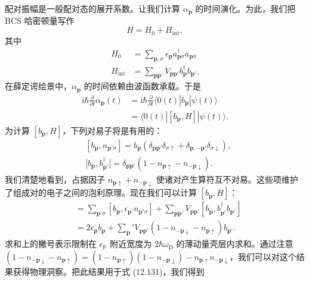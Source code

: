 配对振幅是一般配对态的展开系数。让我们计算 $\alpha_{\mathbf p}$ 的时间演化。为此，我们把 BCS 哈密顿量写作
\begin{equation*}
H=H_0+H_{\mathrm{int}}, \tag{12.127}
\end{equation*}
其中
\begin{align*}
H_0&=\sum_{\mathbf p,\sigma}\epsilon_{\mathbf p}a^\dagger_{\mathbf p\sigma}a_{\mathbf p\sigma}\\
H_{\mathrm{int}}&=\sum_{\mathbf p\mathbf p'}V_{\mathbf p\mathbf p'}b^\dagger_{\mathbf p}b_{\mathbf p'}. \tag{12.128}
\end{align*}
在薛定谔绘景中，$\alpha_{\mathbf p}$ 的时间依赖由波函数承载。于是
\begin{align*}
\mathrm i\hbar\frac{\partial}{\partial t}\alpha_{\mathbf p}(t)&=\mathrm i\hbar\frac{\partial}{\partial t}\big\langle 0(t)\left|b_{\mathbf p}\right|\psi(t)\big\rangle\\
&=\big\langle 0(t)\left|\left[b_{\mathbf p},H\right]\right|\psi(t)\big\rangle. \tag{12.129}
\end{align*}
为计算 $[b_{\mathbf p},H]$，下列对易子将是有用的：
\begin{align*}
&\left[b_{\mathbf p},n_{\mathbf p'\sigma}\right]=b_{\mathbf p}\left(\delta_{\mathbf p\mathbf p'}\delta_{\sigma\uparrow}+\delta_{\mathbf p,-\mathbf p'}\delta_{\sigma\downarrow}\right),\\
&\Big[b_{\mathbf p},b^\dagger_{\mathbf p'}\Big]=\delta_{\mathbf p\mathbf p'}\left(1-n_{\mathbf p\uparrow}-n_{-\mathbf p\downarrow}\right). \tag{12.130}
\end{align*}
我们清楚地看到，占据因子 $n_{\mathbf p\uparrow}+n_{-\mathbf p\downarrow}$ 使诸对产生算符互不对易。这些项维护了组成对的电子之间的泡利原理。现在我们可以计算 $[b_{\mathbf p},H]$：
\begin{align*}
[b_{\mathbf p},H]&=\sum_{\mathbf p'\sigma}\left[b_{\mathbf p},\epsilon_{\mathbf p'}n_{\mathbf p'\sigma}\right]+\sum_{\mathbf p\mathbf p'}V_{\mathbf p\mathbf p'}\left[b_{\mathbf p},b^\dagger_{\mathbf p'}b_{\mathbf p'}\right]\\
&=2\epsilon_{\mathbf p}b_{\mathbf p}+{\sum_{\mathbf p}}'V_{\mathbf p\mathbf p'}\left(1-n_{-\mathbf p\downarrow}-n_{\mathbf p\uparrow}\right)b_{\mathbf p'}. \tag{12.131}
\end{align*}
求和上的撇号表示限制在 $\epsilon_{\mathrm F}$ 附近宽度为 $2\hbar\omega_{\mathrm D}$ 的薄动量壳层内求和。通过注意 $\left(1-n_{-\mathbf p\downarrow}-n_{\mathbf p\uparrow}\right)=\left(1-n_{\mathbf p\uparrow}\right)\left(1-n_{-\mathbf p\downarrow}\right)-n_{\mathbf p\uparrow}n_{-\mathbf p\downarrow}$，我们可以对这个结果获得物理洞察。把此结果用于式 (12.131)，我们得到
